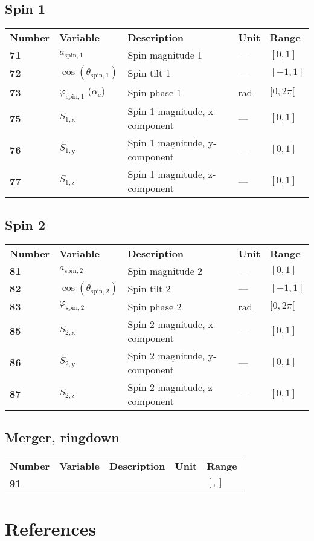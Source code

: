 \documentclass[10pt]{article}
\begin{document}
\subsection{Spin 1}
\begin{tabular}{lllll}
  \textbf{Number} & \textbf{Variable} & \textbf{Description} & \textbf{Unit} & \textbf{Range} \\
  \textbf{71} & $a_\mathrm{spin,1}$  & Spin magnitude 1 & --- & $[0,1]$ \\
  \textbf{72} & $\cos(\theta_\mathrm{spin,1})$  & Spin tilt 1 & --- & $[-1,1]$ \\
  \textbf{73} & $\varphi_\mathrm{spin,1}$  ($\alpha_\mathrm{c}$)  & Spin phase 1 & rad & $[0,2\pi[$ \\
  \textbf{75} & $S_\mathrm{1,x}$  & Spin 1 magnitude, x-component & --- & $[0,1]$ \\
  \textbf{76} & $S_\mathrm{1,y}$  & Spin 1 magnitude, y-component & --- & $[0,1]$ \\
  \textbf{77} & $S_\mathrm{1,z}$  & Spin 1 magnitude, z-component & --- & $[0,1]$ \\
\end{tabular}

\subsection{Spin 2}
\begin{tabular}{lllll}
  \textbf{Number} & \textbf{Variable} & \textbf{Description} & \textbf{Unit} & \textbf{Range} \\
  \textbf{81} & $a_\mathrm{spin,2}$  & Spin magnitude 2 & --- & $[0,1]$ \\
  \textbf{82} & $\cos(\theta_\mathrm{spin,2})$  & Spin tilt 2 & --- & $[-1,1]$ \\
  \textbf{83} & $\varphi_\mathrm{spin,2}$  & Spin phase 2 & rad & $[0,2\pi[$ \\
  \textbf{85} & $S_\mathrm{2,x}$  & Spin 2 magnitude, x-component & --- & $[0,1]$ \\
  \textbf{86} & $S_\mathrm{2,y}$  & Spin 2 magnitude, y-component & --- & $[0,1]$ \\
  \textbf{87} & $S_\mathrm{2,z}$  & Spin 2 magnitude, z-component & --- & $[0,1]$ \\
\end{tabular}

\subsection{Merger, ringdown}
\begin{tabular}{lllll}
  \textbf{Number} & \textbf{Variable} & \textbf{Description} & \textbf{Unit} & \textbf{Range} \\
  \textbf{91} &   & & & $[,]$ \\
\end{tabular}




\section*{References}

\end{document}
